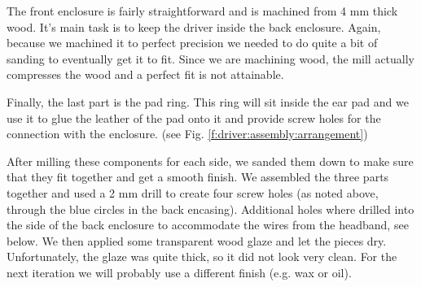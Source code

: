 \documentclass{article}
\begin{document}
The front enclosure is fairly straightforward and is machined from 4 mm thick wood. It's main task is to keep the driver inside the back enclosure. Again, because we machined it to perfect precision we needed to do quite a bit of sanding to eventually get it to fit. Since we are machining wood, the mill actually compresses the wood and a perfect fit is not attainable.

Finally, the last part is the pad ring. This ring will sit inside the ear pad and we use it to glue the leather of the pad onto it and provide screw holes for the connection with the enclosure. (see Fig. \ref{f:driver:assembly:arrangement})

After milling these components for each side, we sanded them down to make sure that they fit together and get a smooth finish. We assembled the three parts together and used a 2 mm drill to create four screw holes (as noted above, through the blue circles in the back encasing). Additional holes where drilled into the side of the back enclosure to accommodate the wires from the headband, see below. We then applied some transparent wood glaze and let the pieces dry. Unfortunately, the glaze was quite thick, so it did not look very clean. For the next iteration we will probably use a different finish (e.g. wax or oil).

\end{document}
